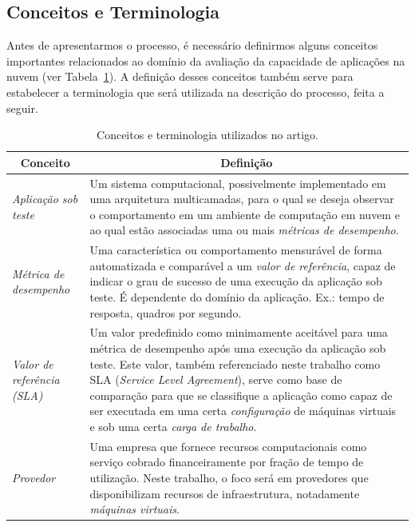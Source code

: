 \documentclass[12pt]{article}
\begin{document}
\subsection{Conceitos e Terminologia}

Antes de apresentarmos o processo, é necessário definirmos alguns conceitos importantes relacionados ao domínio da avaliação da capacidade de aplicações na nuvem (ver \mbox{Tabela~\ref{tab:concepts}}). A definição desses conceitos também serve para estabelecer a terminologia que será utilizada na descrição do processo, feita a seguir.

\begin{table}[t*]
\centering\scriptsize
\caption{Conceitos e terminologia utilizados no artigo.}
\label{tab:concepts}
\begin{tabularx}{\linewidth}{lX}
\toprule
\multicolumn{1}{c}{\textbf{Conceito}} & \multicolumn{1}{c}{\textbf{Definição}} \\
\midrule
\emph{Aplicação sob teste} & Um sistema computacional, possivelmente implementado em uma arquitetura multicamadas, para o qual se deseja observar o comportamento em um ambiente de computação em nuvem e ao qual estão associadas uma ou mais {\em métricas de desempenho}.
\\[0.03cm]%
\emph{Métrica de desempenho} &
Uma característica ou comportamento mensurável de forma automatizada e comparável a um {\em valor de referência}, capaz de indicar o grau de sucesso de uma execução da aplicação sob teste. É dependente do domínio da aplicação. Ex.: tempo de resposta, quadros por segundo.
\\[0.03cm]%
\emph{Valor de referência (SLA)} &
Um valor predefinido como minimamente aceitável  para uma métrica de desempenho após uma execução da aplicação sob teste. Este valor, também referenciado neste trabalho como SLA (\emph{Service Level Agreement}), serve como base de comparação para que se classifique a aplicação como capaz de ser executada em uma certa {\em configuração} de máquinas virtuais e sob uma certa {\em carga de trabalho}.
\\[0.03cm]%
\emph{Provedor} &
Uma empresa que fornece recursos computacionais como serviço cobrado financeiramente por fração de tempo de utilização. Neste trabalho, o foco será em provedores que disponibilizam recursos de infraestrutura, notadamente {\em máquinas virtuais}.

\end{tabularx}
\end{table}
\end{document}
